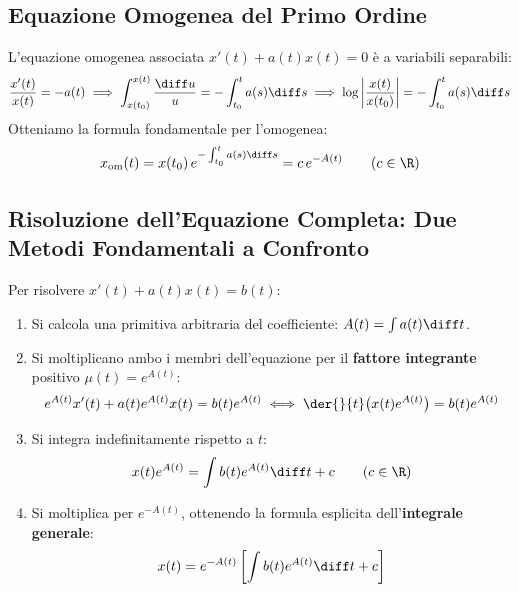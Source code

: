 \subsection{Equazione Omogenea del Primo Ordine}
L'equazione omogenea associata $x'(t) + a(t)x(t) = 0$ è a variabili separabili:
\[
    \frac{x'(t)}{x(t)} = -a(t) \implies \int_{x(t_0)}^{x(t)} \frac{\diff u}{u} = -\int_{t_0}^t a(s) \diff s \implies \log\left|\frac{x(t)}{x(t_0)}\right| = -\int_{t_0}^t a(s) \diff s
\]
Otteniamo la formula fondamentale per l'omogenea:
\begin{equation}
    \label{eq:omogenea_1ord_sol}
    x_{\text{om}}(t) = x(t_0)\, e^{-\int_{t_0}^t a(s) \diff s} = c\, e^{-A(t)} \qquad (c \in \R)
\end{equation}

\subsection{Risoluzione dell'Equazione Completa: Due Metodi Fondamentali a Confronto}

\begin{metodo}
Per risolvere $x'(t) + a(t)x(t) = b(t)$:
\begin{enumerate}
    \item Si calcola una primitiva arbitraria del coefficiente: $A(t) = \int a(t) \diff t$.
    \item Si moltiplicano ambo i membri dell'equazione per il \textbf{fattore integrante} positivo $\mu(t) = e^{A(t)}$:
    \[
        e^{A(t)} x'(t) + a(t) e^{A(t)} x(t) = b(t) e^{A(t)} \iff \der{}{t}\big( x(t) e^{A(t)} \big) = b(t) e^{A(t)}
    \]
    \item Si integra indefinitamente rispetto a $t$:
    \[
        x(t) e^{A(t)} = \int b(t) e^{A(t)} \diff t + c \qquad (c \in \R)
    \]
    \item Si moltiplica per $e^{-A(t)}$, ottenendo la formula esplicita dell'\textbf{integrale generale}:
    \begin{equation}
        \label{eq:metodo1_formula}
        x(t) = e^{-A(t)} \left[ \int b(t) e^{A(t)} \diff t + c \right]
    \end{equation}
\end{enumerate}
\end{metodo}

